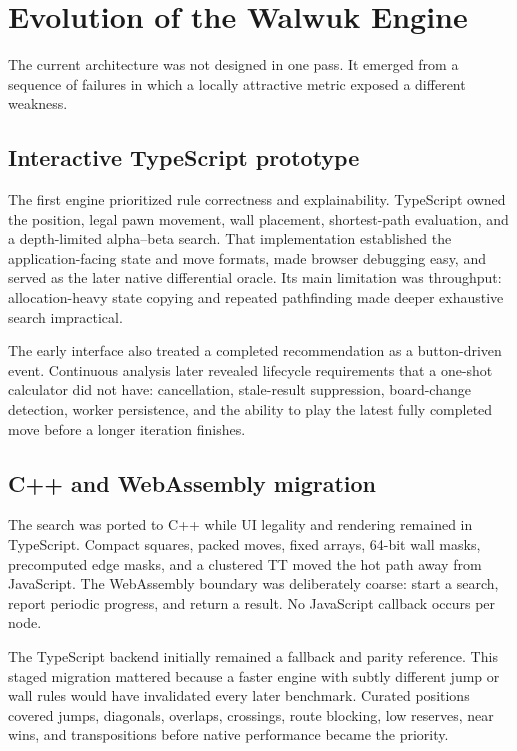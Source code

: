 \section{Evolution of the Walwuk Engine}
The current architecture was not designed in one pass. It emerged from a sequence of failures in which a locally attractive metric exposed a different weakness.

\subsection{Interactive TypeScript prototype}
The first engine prioritized rule correctness and explainability. TypeScript owned the position, legal pawn movement, wall placement, shortest-path evaluation, and a depth-limited alpha--beta search. That implementation established the application-facing state and move formats, made browser debugging easy, and served as the later native differential oracle. Its main limitation was throughput: allocation-heavy state copying and repeated pathfinding made deeper exhaustive search impractical.

The early interface also treated a completed recommendation as a button-driven event. Continuous analysis later revealed lifecycle requirements that a one-shot calculator did not have: cancellation, stale-result suppression, board-change detection, worker persistence, and the ability to play the latest fully completed move before a longer iteration finishes.

\subsection{C++ and WebAssembly migration}
The search was ported to C++ while UI legality and rendering remained in TypeScript. Compact squares, packed moves, fixed arrays, 64-bit wall masks, precomputed edge masks, and a clustered TT moved the hot path away from JavaScript. The WebAssembly boundary was deliberately coarse: start a search, report periodic progress, and return a result. No JavaScript callback occurs per node.

The TypeScript backend initially remained a fallback and parity reference. This staged migration mattered because a faster engine with subtly different jump or wall rules would have invalidated every later benchmark. Curated positions covered jumps, diagonals, overlaps, crossings, route blocking, low reserves, near wins, and transpositions before native performance became the priority.


